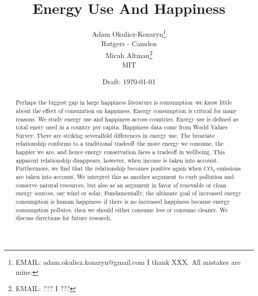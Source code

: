 \documentclass[10pt, letterpaper]{article}
\date{Draft: {}\today}
\title{
Energy Use And Happiness
}
\author{
Adam Okulicz-Kozaryn\thanks{EMAIL: adam.okulicz.kozaryn@gmail.com
  \hfill I thank XXX.  All mistakes are mine.} \\
{\small Rutgers - Camden}\\
Micah Altman\thanks{EMAIL: ???
  \hfill I ???} \\
{\small MIT}
}
\begin{document}

%
\maketitle
\vspace{-.4in}
\begin{center}

\end{center}

\begin{abstract}
\noindent Perhaps the biggest gap in large happiness literature is
consumption--we know little about the effect of consumtion on happiness. Energy
consumption is critical for many reasons.  We study energy use and happiness across countries.  Energy
use is defined as total enery used in a country per capita. Happiness data come
 from World Values Survey. There are striking severalfold differences in
energy use. The bivariate relationship conforms to a traditional tradeoff--the
more energy we consume, the happier we are, and hence energy conservation faces
a tradeoff in wellbeing. This apparent relationship disappears, however, when
income is taken into account. Furthermore, we find that the relationship becomes
positive again when $CO_2$ emissions are taken into account. We interpret this
 as another argument to curb pollution and conserve natural resources, but also
 as an argument in favor of renevable or clean energy sources, say wind or solar.  %
 Fundamentally, the ultimate goal of increased energy consumption is human
 happiness--if there is no increased happiness because energy consumption
 pollutes, then we should either consume less or consume cleaner. We discuss directions for future research.
\end{abstract}
\vspace{.15in} 
\end{document}
